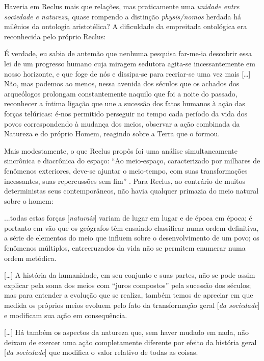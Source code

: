 Haveria em Reclus mais que relações, mas praticamente uma \textit{unidade entre sociedade e natureza}, quase rompendo a distinção \textit{physis/nomos }herdada há milênios da ontologia aristotélica? A dificuldade da empreitada ontológica era reconhecida pelo próprio Reclus:

\begin{citacao}
É verdade, eu sabia de antemão que nenhuma pesquisa far-me-ia descobrir essa lei de um progresso humano cuja miragem sedutora agita-se incessantemente em nosso horizonte, e que foge de nós e dissipa-se para recriar-se uma vez mais [{\dots}] Não, mas podemos ao menos, nessa avenida dos séculos que os achados dos arqueólogos prolongam constantemente naquilo que foi a noite do passado, reconhecer a íntima ligação que une a sucessão dos fatos humanos à ação das forças telúricas: é-nos permitido perseguir no tempo cada período da vida dos povos correspondendo à mudança dos meios, observar a ação combinada da Natureza e do próprio Homem, reagindo sobre a Terra que o formou. \cite[pp. 45-46]{reclus_renovacao_2010}
\end{citacao}

Mais modestamente, o que Reclus propôs foi uma análise simultaneamente sincrônica e diacrônica do espaço: ``Ao meio-espaço, caracterizado por milhares de fenômenos exteriores, deve-se ajuntar o meio-tempo, com suas transformações incessantes, suas repercussões sem fim'' \cite[p.~110]{RECLUS1905a}. Para Reclus, ao contrário de muitos deterministas seus contemporâneos, não havia qualquer primazia do meio natural sobre o homem:

\begin{citacao}
...todas estas forças [\textit{naturais}] variam de lugar em lugar e de época em época; é portanto em vão que os geógrafos têm ensaiado classificar numa ordem definitiva, a série de elementos do meio que influem sobre o desenvolvimento de um povo; os fenômenos múltiplos, entrecruzados da vida não se permitem enumerar numa ordem metódica.

[{\dots}] A história da humanidade, em seu conjunto e suas partes, não se pode assim explicar pela soma dos meios com ``juros compostos'' pela sucessão dos séculos; mas para entender a evolução que se realiza, também temos de apreciar em que medida os próprios meios evoluem pelo fato da transformação geral [\textit{da sociedade}] e modificam sua ação em consequência.  

[{\dots}] Há também os aspectos da natureza que, sem haver mudado em nada, não deixam de exercer uma ação completamente diferente por efeito da história geral [\textit{da sociedade}] que modifica o valor relativo de todas as coisas. \cite[pp.~112-114]{RECLUS1905a}
\end{citacao}


